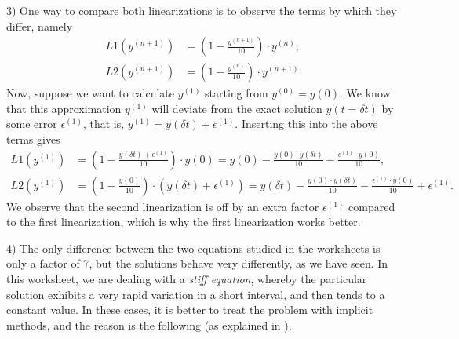 \documentclass[a4paper,10pt]{article}
\begin{document}
3) One way to compare both linearizations is to observe the terms by which they differ, namely
\begin{subequations}
\begin{align}
L1(y^{(n+1)}) &= \left(1-\frac{y^{(n+1)}}{10}\right)\cdot y^{(n)},\\
L2(y^{(n+1)}) &= \left(1-\frac{y^{(n)}}{10}\right)\cdot y^{(n+1)}.
\end{align}
\label{eq:Lterms}
\end{subequations}
Now, suppose we want to calculate $y^{(1)}$ starting from $y^{(0)}=y(0)$. We know that this approximation $y^{(1)}$ will deviate from the exact solution $y(t = \delta t)$ by some error $\epsilon^{(1)}$, that is, $y^{(1)}=y(\delta t) + \epsilon^{(1)}$. Inserting this into the above terms gives
\begin{subequations}
\begin{align}
L1(y^{(1)}) &= \left(1-\frac{y(\delta t)+\epsilon^{(1)}}{10}\right)\cdot y(0) = y(0)-\frac{y(0)\cdot y(\delta t)}{10}-\frac{\epsilon^{(1)}\cdot y(0)}{10},\\
L2(y^{(1)}) &= \left(1-\frac{y(0)}{10}\right)\cdot (y(\delta t)+\epsilon^{(1)}) = y(\delta t)-\frac{y(0)\cdot y(\delta t)}{10}-\frac{\epsilon^{(1)}\cdot y(0)}{10}+\epsilon^{(1)}.
\end{align}
\label{eq:Lterms2}
\end{subequations}
We observe that the second linearization is off by an extra factor $\epsilon^{(1)}$ compared to the first linearization, which is why the first linearization works better.

\vspace{3mm}

4) The only difference between the two equations studied in the worksheets is only a factor of 7, but the solutions behave very differently, as we have seen. In this worksheet, we are dealing with a \textit{stiff equation}, whereby the particular solution exhibits a very rapid variation in a short interval, and then tends to a constant value. In these cases, it is better to treat the problem with implicit methods, and the reason is the following (as explained in \cite{Gol_Ort}).
\end{document}
